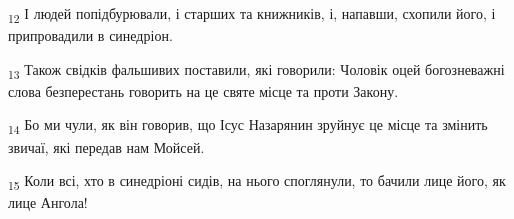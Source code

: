 \begin{tcolorbox}
\textsubscript{12} І людей попідбурювали, і старших та книжників, і, напавши, схопили його, і припровадили в синедріон.
\end{tcolorbox}
\begin{tcolorbox}
\textsubscript{13} Також свідків фальшивих поставили, які говорили: Чоловік оцей богозневажні слова безперестань говорить на це святе місце та проти Закону.
\end{tcolorbox}
\begin{tcolorbox}
\textsubscript{14} Бо ми чули, як він говорив, що Ісус Назарянин зруйнує це місце та змінить звичаї, які передав нам Мойсей.
\end{tcolorbox}
\begin{tcolorbox}
\textsubscript{15} Коли всі, хто в синедріоні сидів, на нього споглянули, то бачили лице його, як лице Ангола!
\end{tcolorbox}
